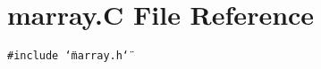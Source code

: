 \section{marray.C File Reference}
\label{marray_C}
{\tt \#include \char`\"{}marray.h\char`\"{}}\par
